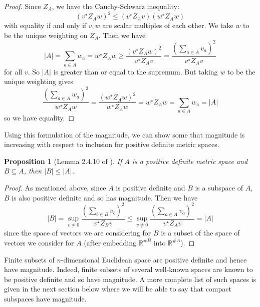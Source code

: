 \documentclass[11pt]{article}
\theoremstyle{mythm}
\newtheorem{prop}[defn]{Proposition}
\begin{document}
\begin{proof}
Since $Z_A$, we have the Cauchy-Schwarz inequality:
\begin{equation*}
(v^\star Z_A w)^2 \leq (v^\star Z_Av)(w^\star Z_Aw)
\end{equation*}
with equality if and only if $v,w$ are scalar multiples of each other. We take $w$ to be the unique weighting on $Z_A$. Then we have
\begin{equation*}
\vert A \vert = \sum\limits_{a\in A}w_a = w^\star Z_Aw \geq \frac{(v^\star Z_Aw)^2}{v^\star Z_Av} = \frac{\left(\sum_{a\in A}v_a\right)^2}{v^\star Z_Av}
\end{equation*}
for all $v$. So $\vert A \vert$ is greater than or equal to the supremum. But taking $w$ to be the unique weighting gives
\begin{equation*}
\frac{\left(\sum_{a\in A}w_a\right)^2}{w^\star Z_Aw} = \frac{(w^\star Z_Aw)^2}{w^\star Z_Aw} = w^\star Z_Aw = \sum\limits_{a\in A}w_a = \vert A \vert
\end{equation*}
so we have equality.
\end{proof}

Using this formulation of the magnitude, we can show some that magnitude is increasing with respect to inclusion for positive definite metric spaces.

\begin{prop}[Lemma 2.4.10 of \cite{leinster_magnitude_2011}]\label{prop:finiteposdefincreasing}
If $A$ is a positive definite metric space and $B \subseteq A$, then $\vert B \vert \leq \vert A \vert$.
\end{prop}

\begin{proof}
As mentioned above, since $A$ is positive definite and $B$ is a subspace of $A$, $B$ is also positive definite and so has magnitude. Then we have
\begin{equation*}
\vert B \vert = \sup\limits_{v\neq0}\frac{(\sum_{b\in B} v_b)^2}{v^\star Z_Bv} \leq \sup\limits_{v\neq0}\frac{(\sum_{a\in A}v_a)^2}{v^\star Z_Av} = \vert A\vert
\end{equation*}
since the space of vectors we are considering for $B$ is a subset of the space of vectors we consider for $A$ (after embedding $\mathbb{R}^{\#B}$ into $\mathbb{R}^{\#A}$).
\end{proof}

Finite subsets of $n$-dimensional Euclidean space are positive definite and hence have magnitude. Indeed, finite subsets of several well-known spaces are known to be positive definite and so have magnitude. A more complete list of such spaces is given in the next section below where we will be able to say that compact subspaces have magnitude.
\end{document}
